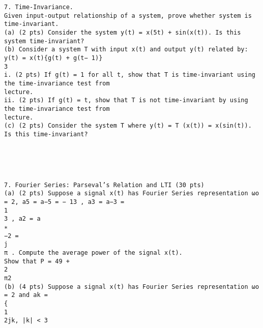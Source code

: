 \documentclass[11pt,addpoints]{exam}
\begin{document}
\begin{verbatim}
7. Time-Invariance.
Given input-output relationship of a system, prove whether system is time-invariant.
(a) (2 pts) Consider the system y(t) = x(5t) + sin(x(t)). Is this system time-invariant?
(b) Consider a system T with input x(t) and output y(t) related by:
y(t) = x(t){g(t) + g(t− 1)}
3
i. (2 pts) If g(t) = 1 for all t, show that T is time-invariant using the time-invariance test from
lecture.
ii. (2 pts) If g(t) = t, show that T is not time-invariant by using the time-invariance test from
lecture.
(c) (2 pts) Consider the system T where y(t) = T (x(t)) = x(sin(t)). Is this time-invariant?





7. Fourier Series: Parseval’s Relation and LTI (30 pts)
(a) (2 pts) Suppose a signal x(t) has Fourier Series representation ωo = 2, a5 = a−5 = − 13 , a3 = a−3 =
1
3 , a2 = a
∗
−2 =
j
π . Compute the average power of the signal x(t).
Show that P = 49 +
2
π2
(b) (4 pts) Suppose a signal x(t) has Fourier Series representation ωo = 2 and ak =
{
1
2jk, |k| < 3





\end{verbatim}
\end{document}
